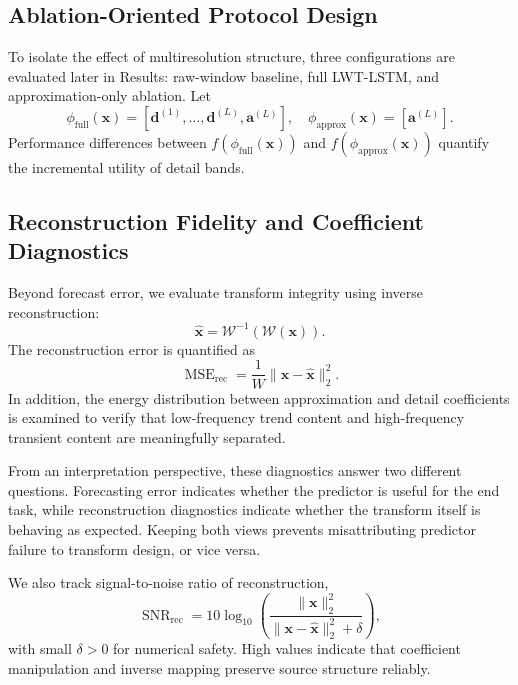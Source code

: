 \documentclass[journal]{IEEEtran}
\begin{document}
\subsection{Ablation-Oriented Protocol Design}
To isolate the effect of multiresolution structure, three configurations are evaluated later in Results: raw-window baseline, full LWT-LSTM, and approximation-only ablation. Let
\begin{equation}
\phi_{\text{full}}(\mathbf{x})=[\mathbf{d}^{(1)},\ldots,\mathbf{d}^{(L)},\mathbf{a}^{(L)}],
\quad
\phi_{\text{approx}}(\mathbf{x})=[\mathbf{a}^{(L)}].
\end{equation}
Performance differences between $f(\phi_{\text{full}}(\mathbf{x}))$ and $f(\phi_{\text{approx}}(\mathbf{x}))$ quantify the incremental utility of detail bands.

\subsection{Reconstruction Fidelity and Coefficient Diagnostics}
Beyond forecast error, we evaluate transform integrity using inverse reconstruction:
\begin{equation}
\hat{\mathbf{x}}=\mathcal{W}^{-1}(\mathcal{W}(\mathbf{x})).
\end{equation}
The reconstruction error is quantified as
\begin{equation}
\operatorname{MSE}_{\text{rec}}=\frac{1}{W}\lVert \mathbf{x}-\hat{\mathbf{x}}\rVert_2^2.
\end{equation}
In addition, the energy distribution between approximation and detail coefficients is examined to verify that low-frequency trend content and high-frequency transient content are meaningfully separated.

From an interpretation perspective, these diagnostics answer two different questions. Forecasting error indicates whether the predictor is useful for the end task, while reconstruction diagnostics indicate whether the transform itself is behaving as expected. Keeping both views prevents misattributing predictor failure to transform design, or vice versa.

We also track signal-to-noise ratio of reconstruction,
\begin{equation}
\operatorname{SNR}_{\text{rec}}=10\log_{10}\left(\frac{\|\mathbf{x}\|_2^2}{\|\mathbf{x}-\hat{\mathbf{x}}\|_2^2+\delta}\right),
\end{equation}
with small $\delta>0$ for numerical safety. High values indicate that coefficient manipulation and inverse mapping preserve source structure reliably.
\end{document}

